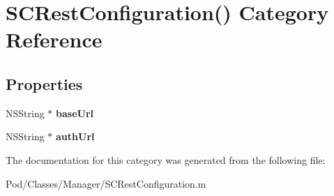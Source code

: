 \hypertarget{category_s_c_rest_configuration_07_08}{}\section{S\+C\+Rest\+Configuration() Category Reference}
\label{category_s_c_rest_configuration_07_08}
\subsection*{Properties}
\begin{DoxyCompactItemize}
\item 
N\+S\+String $\ast$ {\bfseries base\+Url}\hypertarget{category_s_c_rest_configuration_07_08_a514b29bc3a511ac20a1481ea462b2b97}{}\label{category_s_c_rest_configuration_07_08_a514b29bc3a511ac20a1481ea462b2b97}

\item 
N\+S\+String $\ast$ {\bfseries auth\+Url}\hypertarget{category_s_c_rest_configuration_07_08_af3729b622444a5810b5390eb8ea7a32f}{}\label{category_s_c_rest_configuration_07_08_af3729b622444a5810b5390eb8ea7a32f}

\end{DoxyCompactItemize}


The documentation for this category was generated from the following file\+:\begin{DoxyCompactItemize}
\item 
Pod/\+Classes/\+Manager/S\+C\+Rest\+Configuration.\+m\end{DoxyCompactItemize}
